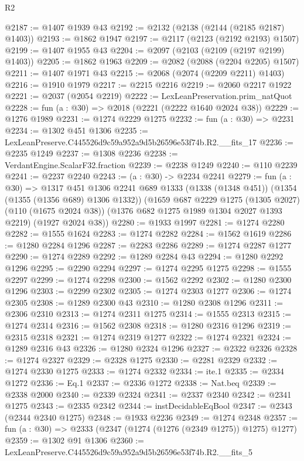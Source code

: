 \begin{lexlean}{R2}
\begin{coremodule}
@2187 := @1407 @1939 @43
@2192 := @2132 (@2138 (@2144 (@2185 @2187) @1403))
@2193 := @1862 @1947
@2197 := @2117 (@2123 (@2192 @2193) @1507)
@2199 := @1407 @1955 @43
@2204 := @2097 (@2103 (@2109 (@2197 @2199) @1403))
@2205 := @1862 @1963
@2209 := @2082 (@2088 (@2204 @2205) @1507)
@2211 := @1407 @1971 @43
@2215 := @2068 (@2074 (@2209 @2211) @1403)
@2216 := @1910 @1979
@2217 := @2215 @2216
@2219 := @2060 @2217 @1922
@2221 := @2037 (@2054 @2219)
@2222 := LexLeanPreservation.prim_natQuot
@2228 := fun (a : @30) => @2018 (@2221 (@2222 @1640 @2024 @38))
@2229 := @1276 @1989
@2231 := @1274 @2229 @1275
@2232 := fun (a : @30) => @2231
@2234 := @1302 @451 @1306
@2235 := LexLeanPreserve.C445526d9c59a952a9d5b26596e53f74b.R2.__fits_17
@2236 := @2235 @1249
@2237 := @1308 @2236
@2238 := VerdantEngine.ScalarF32.fraction
@2239 := @2238 @1249
@2240 := @110 @2239
@2241 := @2237 @2240
@2243 := (a : @30) -> @2234 @2241
@2279 := fun (a : @30) =>
  @1317
    @451
    @1306
    @2241
    @689
    @1333
    (@1338 (@1348 @451))
    (@1354 (@1355 (@1356 @689) @1306 @1332))
    (@1659
      @687
      @2229
      @1275
      (@1305 @2027)
      (@110 (@1675 @2024 @38))
      (@1376 @682 @1275 @1989 @1304 @2027 @1393 @2219)
      (@1927 @2024 @38))
@2280 := @1933 @1997
@2281 := @1274 @2280
@2282 := @1555 @1624
@2283 := @1274 @2282
@2284 := @1562 @1619
@2286 := @1280 @2284 @1296
@2287 := @2283 @2286
@2289 := @1274 @2287 @1277
@2290 := @1274 @2289
@2292 := @1289 @2284 @43
@2294 := @1280 @2292 @1296
@2295 := @2290 @2294
@2297 := @1274 @2295 @1275
@2298 := @1555 @2297
@2299 := @1274 @2298
@2300 := @1562 @2292
@2302 := @1280 @2300 @1296
@2303 := @2299 @2302
@2305 := @1274 @2303 @1277
@2306 := @1274 @2305
@2308 := @1289 @2300 @43
@2310 := @1280 @2308 @1296
@2311 := @2306 @2310
@2313 := @1274 @2311 @1275
@2314 := @1555 @2313
@2315 := @1274 @2314
@2316 := @1562 @2308
@2318 := @1280 @2316 @1296
@2319 := @2315 @2318
@2321 := @1274 @2319 @1277
@2322 := @1274 @2321
@2324 := @1289 @2316 @43
@2326 := @1280 @2324 @1296
@2327 := @2322 @2326
@2328 := @1274 @2327
@2329 := @2328 @1275
@2330 := @2281 @2329
@2332 := @1274 @2330 @1275
@2333 := @1274 @2332
@2334 := ite.{1}
@2335 := @2334 @1272
@2336 := Eq.{1}
@2337 := @2336 @1272
@2338 := Nat.beq
@2339 := @2338 @2000
@2340 := @2339 @2324
@2341 := @2337 @2340
@2342 := @2341 @1275
@2343 := @2335 @2342
@2344 := instDecidableEqBool
@2347 := @2343 (@2344 @2340 @1275)
@2348 := @1933 @2236
@2349 := @1274 @2348
@2357 := fun (a : @30) => @2333 (@2347 (@1274 (@1276 (@2349 @1275)) @1275) @1277)
@2359 := @1302 @91 @1306
@2360 := LexLeanPreserve.C445526d9c59a952a9d5b26596e53f74b.R2.__fits_5

\end{coremodule}
\end{lexlean}

